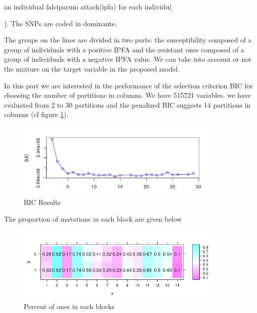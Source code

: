 \documentclass[a4paper]{article}
\begin{document}
an individual falciparum attack(ipfa) for each individu({ \cite{loucoubar2016detecting}). The SNPs are coded in dominante. 

The groups on the lines are divided in two parts:  the susceptibility composed of a group of individuals with a positive IPFA and the  resistant ones composed of a group of individuals with a negative IPFA value.
We can take into account or not the mixture on the target variable in the proposed model. 

 In this part we are interested in the performance of the selection criterion BIC for choosing the number of partitions in columns. We have 515721 variables, we have evaluated from 2  to 30 partitions and the penalized BIC suggests 14 partitions in columns
 (cf figure \ref{BIC}). 
 
 
 
\begin{figure}[!ht]
\begin{center}
\includegraphics[width=10cm, scale=2.0]{image_plots/BIC_article.jpeg}
\end{center}
\caption{BIC Results}
\label{BIC}
\end{figure}

The proportion of mutations in each block are given below
\begin{figure}[!ht]
\begin{center}
\includegraphics[width=10cm, scale=1.0]{image_plots/levelplot_co_clust.jpeg}
\end{center}
\caption{Percent of ones in each blocks}
\label{precent_ones}
\end{figure}




}
\end{document}
